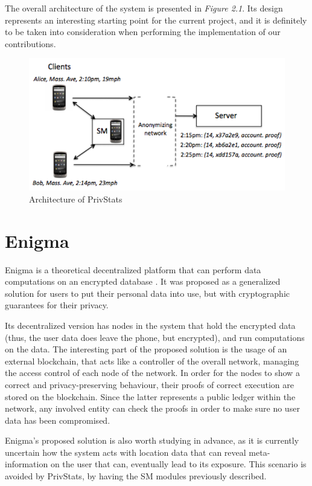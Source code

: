 The overall architecture of the system is presented in \textit{Figure 2.1}. Its design represents an interesting starting point for the current project, and it is definitely to be taken into consideration when performing the implementation of our contributions.
\begin{figure}[h]
\includegraphics[scale=.7]{C2/privStats}
\caption{Architecture of PrivStats\cite{privstats}}
\end{figure}


\section{Enigma}
Enigma is a theoretical decentralized platform that can perform data computations on an encrypted database \cite{enigma}. It was proposed as a generalized solution for users to put their personal data into use, but with cryptographic guarantees for their privacy.

Its decentralized version has nodes in the system that hold the encrypted data (thus, the user data does leave the phone, but encrypted), and run computations on the data. The interesting part of the proposed solution is the usage of an external blockchain, that acts like a controller of the overall network, managing the access control of each node of the network. In order for the nodes to show a correct and privacy-preserving behaviour, their proofs of correct execution are stored on the blockchain. Since the latter represents a public ledger within the network, any involved entity can check the proofs in order to make sure no user data has been compromised.

Enigma's proposed solution is also worth studying in advance, as it is currently uncertain how the system acts with location data that can reveal meta-information on the user that can, eventually lead to its exposure. This scenario is avoided by PrivStats, by having the SM modules previously described.

